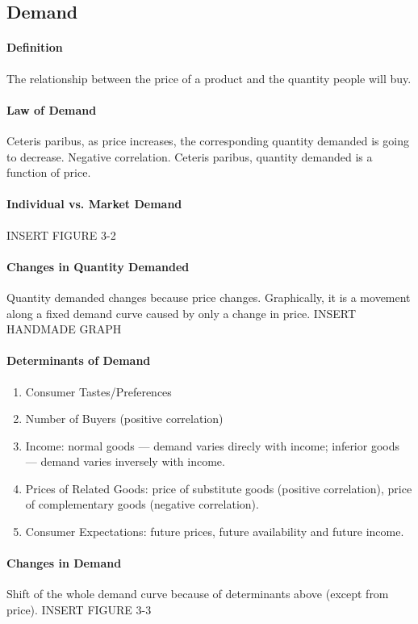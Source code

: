 
\subsection{Demand}
\paragraph{Definition} The relationship between the price of a product and the quantity people will buy.
\paragraph{Law of Demand} Ceteris paribus, as price increases, the corresponding quantity demanded is going to decrease. Negative correlation.
Ceteris paribus, quantity demanded is a function of price.
\begin{figure}[ht]
	\centering
\end{figure}
\paragraph{Individual vs. Market Demand} INSERT FIGURE 3-2
\paragraph{Changes in Quantity Demanded} Quantity demanded changes because price changes. Graphically, it is a movement along a fixed demand curve caused by only a change in price. INSERT HANDMADE GRAPH
\paragraph{Determinants of Demand}
\begin{enumerate}[label = \textbullet]
	\item Consumer Tastes/Preferences
	\item Number of Buyers (positive correlation)
	\item Income: normal goods --- demand varies direcly with income; inferior goods --- demand varies inversely with income.
	\item Prices of Related Goods: price of substitute goods (positive correlation), price of complementary goods (negative correlation).
	\item Consumer Expectations: future prices, future availability and future income.
\end{enumerate}
\paragraph{Changes in Demand} Shift of the whole demand curve because of determinants above (except from price).
INSERT FIGURE 3-3

